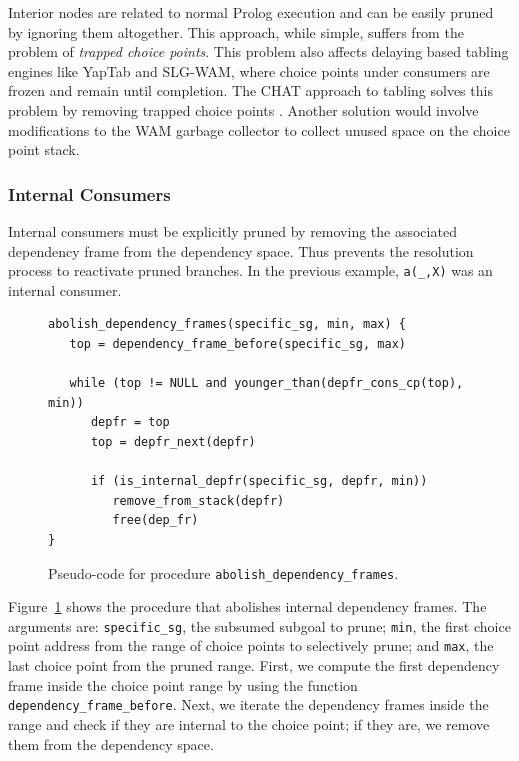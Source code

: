 Interior nodes are related to normal Prolog execution and can be easily pruned
by ignoring them altogether. This approach, while simple, suffers from the problem of \textit{trapped
choice points}. This problem also affects delaying based tabling engines like YapTab and SLG-WAM, where
choice points under consumers are frozen and remain until completion. The CHAT approach to tabling
solves this problem by removing trapped choice points \cite{Demoen-99b}. Another solution would involve
modifications to the WAM garbage collector to collect unused space on the choice point stack.

\subsubsection{Internal Consumers}   
   
Internal consumers must be explicitly pruned by removing the associated
dependency frame from the dependency space. Thus prevents the resolution process to reactivate pruned
branches. In the previous example, \texttt{a(\_,X)} was an internal consumer.

\begin{figure}[ht]
\begin{Verbatim}
abolish_dependency_frames(specific_sg, min, max) {
   top = dependency_frame_before(specific_sg, max)

   while (top != NULL and younger_than(depfr_cons_cp(top), min))
      depfr = top
      top = depfr_next(depfr)

      if (is_internal_depfr(specific_sg, depfr, min))
         remove_from_stack(depfr)
         free(dep_fr)
}
\end{Verbatim}
\caption{Pseudo-code for procedure \texttt{abolish\_dependency\_frames}.}
\label{fig:abolish_dependency_frames}
\end{figure}
   
Figure~\ref{fig:abolish_dependency_frames} shows the procedure that abolishes internal dependency frames.
The arguments are: \texttt{specific\_sg}, the subsumed subgoal to prune; \texttt{min}, the first choice point address from the range of choice points to selectively prune; and \texttt{max}, the last choice point from the pruned range. First, we compute the first dependency frame inside the choice point range by using the function \texttt{dependency\_frame\_before}. Next, we iterate the dependency frames inside the range and check if they are internal to the choice point; if they are, we remove them from the dependency space.

